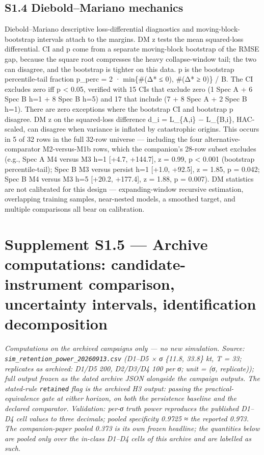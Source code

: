 \documentclass[11pt]{article}
\begin{document}
\subsection{S1.4 Diebold--Mariano
mechanics}\label{s1.4-dieboldmariano-mechanics}

Diebold--Mariano descriptive loss-differential diagnostics and
moving-block-bootstrap intervals attach to the margins. DM z tests the
mean squared-loss differential. CI and p come from a separate
moving-block bootstrap of the RMSE gap, because the square root
compresses the heavy collapse-window tail; the two can disagree, and the
bootstrap is tighter on this data. p is the bootstrap percentile-tail
fraction p\_perc = 2 · min\{\#(Δ* ≤ 0), \#(Δ* ≥ 0)\} / B. The CI
excludes zero iff p \textless{} 0.05, verified with 15 CIs that exclude
zero (1 Spec A + 6 Spec B h=1 + 8 Spec B h=5) and 17 that include (7 + 8
Spec A + 2 Spec B h=1). There are zero exceptions where the bootstrap CI
and bootstrap p disagree. DM z on the squared-loss difference d\_i =
L\_\{A,i\} − L\_\{B,i\}, HAC-scaled, can disagree when variance is
inflated by catastrophic origins. This occurs in 5 of 32 rows in the
full 32-row universe --- including the four alternative-comparator
M2-versus-M1b rows, which the companion's 28-row subset excludes (e.g.,
Spec A M4 versus M3 h=1 {[}+4.7, +144.7{]}, z = 0.99, p \textless{}
0.001 (bootstrap percentile-tail); Spec B M3 versus persist h=1 {[}+1.0,
+92.5{]}, z = 1.85, p = 0.042; Spec B M4 versus M3 h=5 {[}+20.2,
+177.4{]}, z = 1.88, p = 0.007). DM statistics are not calibrated for
this design --- expanding-window recursive estimation, overlapping
training samples, near-nested models, a smoothed target, and multiple
comparisons all bear on calibration.

\section{Supplement S1.5 --- Archive computations: candidate-instrument
comparison, uncertainty intervals, identification
decomposition}\label{supplement-s1.5-archive-computations-candidate-instrument-comparison-uncertainty-intervals-identification-decomposition}

\emph{Computations on the archived campaigns only --- no new simulation.
Source: \texttt{sim\_retention\_power\_20260913.csv} (D1--D5 × σ \{11.8,
33.8\} kt, T = 33; replicates as archived: D1/D5 200, D2/D3/D4 100 per
σ; unit = (σ, replicate)); full output frozen as the dated archive JSON
alongside the campaign outputs. The stated-rule \texttt{retained} flag
is the archived H3 output: passing the practical-equivalence gate at
either horizon, on both the persistence baseline and the declared
comparator. Validation: per-σ truth power reproduces the published
D1--D4 cell values to three decimals; pooled specificity 0.9725 ≈ the
reported 0.973. The companion-paper pooled 0.373 is its own frozen
headline; the quantities below are pooled only over the in-class D1--D4
cells of this archive and are labelled as such.}
\end{document}
